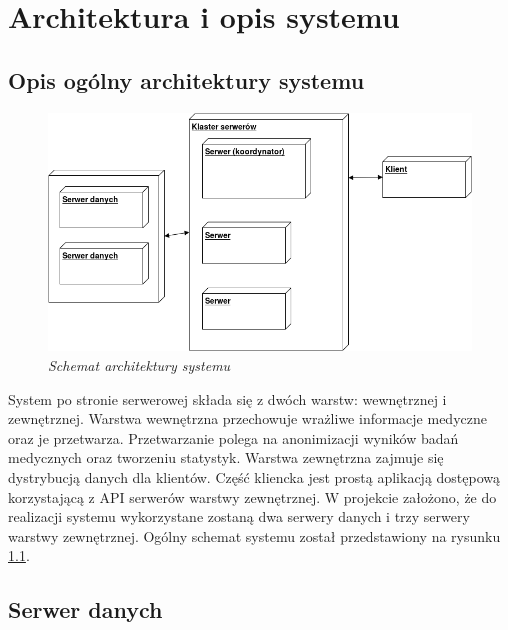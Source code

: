 \chapter{Architektura i opis systemu}

\section{Opis ogólny architektury systemu}

\begin{figure}[!h]
    \begin{center}
    \includegraphics[angle=0,scale=0.55]{img/arch.png}
    \end{center}
    \caption{\em Schemat architektury systemu}
    \label{fig:arch}
\end{figure}


System po stronie serwerowej składa się z dwóch warstw: wewnętrznej i zewnętrznej. Warstwa wewnętrzna przechowuje wrażliwe informacje medyczne oraz je przetwarza. Przetwarzanie polega na anonimizacji wyników badań medycznych oraz tworzeniu statystyk. Warstwa zewnętrzna zajmuje się dystrybucją danych dla klientów. Część kliencka jest prostą aplikacją dostępową korzystającą z API serwerów warstwy zewnętrznej. W projekcie założono, że do realizacji systemu wykorzystane zostaną dwa serwery danych i trzy serwery warstwy zewnętrznej. Ogólny schemat systemu został przedstawiony na rysunku \ref{fig:arch}.

\section{Serwer danych}

